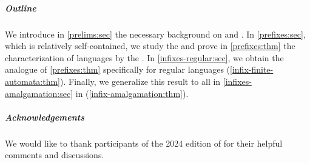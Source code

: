 \subparagraph{Outline} We introduce in \cref{prelims:sec} the
necessary background on  and .
In
\cref{prefixes:sec}, which is relatively
self-contained, we study the  and prove in
\cref{prefixes:thm} the characterization of 
languages by the . In
\cref{infixes-regular:sec}, we
obtain the  analogue of \cref{prefixes:thm}
specifically for regular languages
(\cref{infix-finite-automata:thm}). Finally, we generalize this result to all
 in \cref{infixes-amalgamation:sec}
in
(\cref{infix-amalgamation:thm}).

\subparagraph{Acknowledgements} We would like to thank participants of the 2024
edition of  for their helpful comments and discussions.
